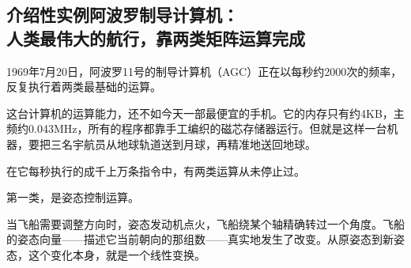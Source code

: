 \documentclass[a4paper,12pt,twoside,openany,fontset=none]{ctexbook}
\numberwithin{equation}{chapter}
\begin{document}
\newcommand{\FourNamedSupplement}[5]{%
 \begingroup\addtocounter{figure}{-1}%
 \renewcommand{\thefigure}{#1}\renewcommand{\theHfigure}{#1}%
 \FourFigure{#2}{#3}{#4}{#5}\endgroup}

\begingroup
\setcounter{figure}{0}
\renewcommand{\thefigure}{\thechapter.0\alph{figure}}
\renewcommand{\theHfigure}{\thechapter.apollo.\arabic{figure}}
\newcommand{\FourNote}[2]{\par\addvspace{5pt}\begingroup
 \linespread{1}\fontsize{10pt}{15pt}\selectfont\color{FourInk!85}
 \interlinepenalty=10000
 \noindent\textbf{#1}\quad #2\par\endgroup\addvspace{5pt}}

\subsection*{介绍性实例\quad 阿波罗制导计算机：\\[4pt]人类最伟大的航行，靠两类矩阵运算完成}

1969年7月20日，阿波罗11号的制导计算机（AGC）正在以每秒约2000次的频率，反复执行着两类最基础的运算。

这台计算机的运算能力，还不如今天一部最便宜的手机。它的内存只有约4KB，主频约0.043MHz，所有的程序都靠手工编织的磁芯存储器运行。但就是这样一台机器，要把三名宇航员从地球轨道送到月球，再精准地送回地球。

在它每秒执行的成千上万条指令中，有两类运算从未停止过。

第一类，是姿态控制运算。

当飞船需要调整方向时，姿态发动机点火，飞船绕某个轴精确转过一个角度。飞船的姿态向量——描述它当前朝向的那组数——真实地发生了改变。从原姿态到新姿态，这个变化本身，就是一个线性变换。
\end{document}
